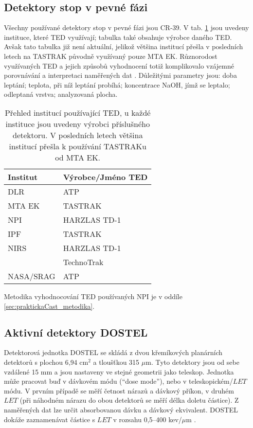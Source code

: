 \subsection{Detektory stop v pevné fázi}
Všechny používané detektory stop v pevné fázi jsou CR-39. V tab. \ref{tab:dosis_pouzivaneTED} jsou uvedeny instituce, které TED využívají; tabulka také obsahuje výrobce daného TED. Avšak tato tabulka již není aktuální, jelikož většina institucí přešla v posledních letech na TASTRAK původně využívaný pouze MTA EK. Různorodost využívaných TED a jejich způsobů vyhodnocení totiž komplikovalo vzájemné porovnávání a interpretaci naměřených dat \cite{cesky}. Důležitými parametry jsou: doba leptání; teplota, při níž leptání probíhá; koncentrace NaOH, jímž se leptalo; odleptaná vrstva; analyzovaná plocha.
\begin{table}[h]
  \def\arraystretch{0.8}
  \centering
  \caption{Přehled institucí používající TED, u každé instituce jsou uvedeny výrobci příslušného detektoru. V posledních letech většina institucí přešla k používání TASTRAKu od MTA EK. \cite{dosis}}
  \label{tab:dosis_pouzivaneTED}
  \begin{tabular}{ll}
	\toprule
	Institut& Výrobce/Jméno TED\\
	\midrule
	DLR&ATP\\
	MTA EK&TASTRAK\\
	NPI&HARZLAS TD-1\\
	IPF&TASTRAK\\ 
	NIRS&HARZLAS TD-1\\
		&TechnoTrak\\
	NASA/SRAG&ATP\\
	\bottomrule
  \end{tabular}
\end{table}

Metodika vyhodnocování TED používaných NPI je v oddíle \ref{sec:praktickaCast_metodika}.

\subsection{Aktivní detektory DOSTEL}\label{experimentDosis_activeDetectors}
Detektorová jednotka DOSTEL se skládá z dvou křemíkových planárních detektorů s plochou  6,94 cm$^2$ a tloušťkou 315 $\mu$m. Tyto detektory jsou od sebe vzdálené 15 mm a jsou nastaveny ve stejné geometrii jako teleskop. Jednotka může pracovat buď v dávkovém módu (``dose mode''), nebo v teleskopickém/$\mathit{LET}$ módu. V prvním případě se měří četnost nárazů a dávkový příkon, v druhém $\mathit{LET}$ (při náhodném nárazu do obou detektorů se měří délka doletu částice). Z naměřených dat lze určit absorbovanou dávku a dávkový ekvivalent. DOSTEL dokáže zaznamenávat částice s $\mathit{LET}$ v rozsahu 0,5--400 kev/$\mu$m \cite{activeDetectors}. 

